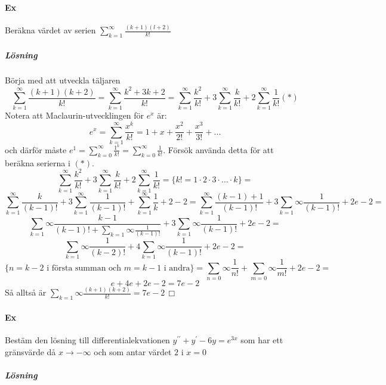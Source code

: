 \paragraph*{Ex} Beräkna värdet av serien $\sum_{k=1}^\infty\frac{(k+1)(l+2)}{k!}$
\subparagraph*{Lösning}
Börja med att utveckla täljaren
\begin{equation*}
    \sum_{k=1}^\infty\frac{(k+1)(k+2)}{k!}=
    \sum_{k=1}^\infty\frac{k^2+3k+2}{k!}=
    \sum_{k=1}^\infty\frac{k^2}{k!}+3\sum_{k=1}^\infty\frac{k}{k!}+2\sum_{k=1}^\infty\frac{1}{k!} (*)
\end{equation*}
Notera att Maclaurin-utvecklingen för $e^x$ är:
\begin{equation*}
    e^x=\sum_{k=1}^\infty\frac{x^k}{k!}=1+x+\frac{x^2}{2!}+\frac{x^3}{3!}+...
\end{equation*}
och därför måste $e^1=\sum_{k=0}^\infty\frac{1^k}{k!}=\sum_{k=0}^\infty\frac{1}{k!}$.
Försök använda detta för att beräkna serierna i $(*)$.
\begin{equation*}
    \sum_{k=1}^\infty\frac{k^2}{k!}+3\sum_{k=1}^\infty\frac{k}{k!}+2\sum_{k=1}^\infty\frac{1}{k!}=
    \{k! =1\cdot 2\cdot 3\cdot ...\cdot k\}=
\end{equation*}
\begin{equation*}
    \sum_{k=1}^\infty\frac{k}{(k-1)!}+3\sum_{k=1}^\infty\frac{1}{(k-1)!}+\sum_{k=1}^\infty\frac{1}{k}+2-2=
    \sum_{k=1}^\infty\frac{(k-1)+1}{(k-1)!}+3\sum_{k=1}\infty\frac{1}{(k-1)!}+2e-2=
\end{equation*}
\begin{equation*}
    \sum_{k=1}\infty\frac{k-1}{(k-1)!+\sum_{k=1}\infty\frac{1}{(k-1)!}}+3\sum_{k=1}\infty\frac{1}{(k-1)!}+2e-2=
\end{equation*}
\begin{equation*}
    \sum_{k=1}\infty\frac{1}{(k-2)!}+4\sum_{k=1}\infty\frac{1}{(k-1)!}+2e-2=
\end{equation*}
\begin{equation*}
    \{n=k-2\text{ i första summan och }m=k-1\text{ i andra}\}=
    \sum_{n=0}\infty\frac{1}{n!}+\sum_{m=0}\infty\frac{1}{m!}+2e-2=
\end{equation*}
\begin{equation*}
    e+4e+2e-2=
    7e-2
\end{equation*}
Så alltså är $\sum_{k=1}\infty\frac{(k+1)(k+2)}{k!}=7e-2\, \Box$

\paragraph{Ex} Bestäm den lösning till differentialekvationen $y^{\prime\prime}+y^\prime-6y=e^{3x}$ som har ett gränsvärde då $x\to-\infty$ och som antar värdet $2$ i $x=0$
\subparagraph{Lösning}


